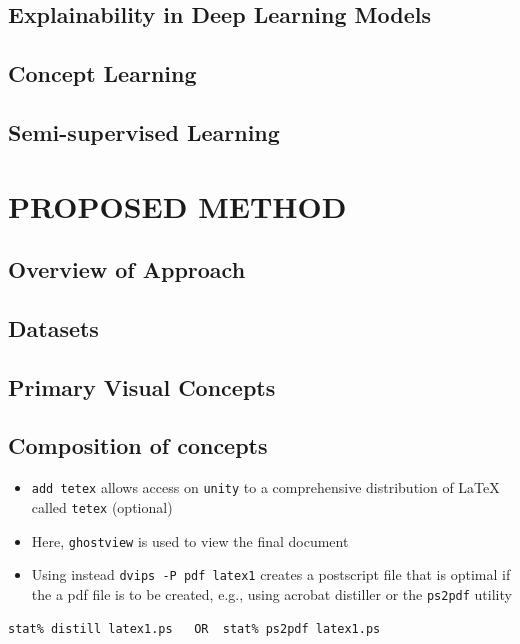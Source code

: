 \documentclass{JMLFS}
\begin{document}
\subsection{Explainability in Deep Learning Models}\label{lit_survey_explainability}
\subsection{Concept Learning}
\subsection{Semi-supervised Learning}

\section{{ PROPOSED METHOD}}

\subsection{Overview of Approach}

\subsection{Datasets}

\subsection{Primary Visual Concepts}
\subsection{Composition of concepts}

\begin{itemize}
\item  {\tt add tetex} allows access on {\tt unity} to a
comprehensive distribution of \LaTeX\, called {\tt tetex} (optional)

\item  Here, {\tt ghostview} is used to view the
final document

\item  Using instead {\tt dvips -P pdf latex1} creates a postscript
file that is optimal if the a pdf file is to be created, e.g.,
using acrobat distiller or the {\tt ps2pdf} utility
\end{itemize}
\begin{verbatim}
stat% distill latex1.ps   OR  stat% ps2pdf latex1.ps
\end{verbatim}
\end{document}
